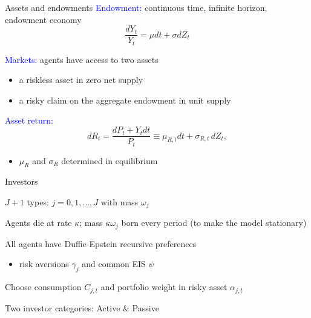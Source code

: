 \documentclass[12pt,aspectratio=169]{beamer}
\newenvironment{wideitemize}{\itemize\addtolength{\itemsep}{10pt}}{\enditemize}
\newcommand{\vspM}{\vspace{0.12truecm}}
\begin{document}
\begin{frame}{Assets and endowments}
    \textcolor{blue}{Endowment:} continuous time, infinite horizon, endowment economy 
    \[\frac{d Y_{t}}{Y_{t}}=\mu dt+\sigma dZ_{t}%
    \]
    
    \vspM
    \textcolor{blue}{Markets:} agents have access to two assets
    \begin{itemize}
        \item a riskless asset in zero net supply
        \item a risky claim on the aggregate endowment in unit supply
    \end{itemize}
    \vspM
    \textcolor{blue}{Asset return:}
    \[ d R_t = \frac{d P_t + Y_t dt}{P_t} \equiv \mu_{R,t} dt + \sigma_{R,t}\, d Z_t,\]
    \begin{itemize}
        \item $\mu_R$ and $\sigma_R$ determined in equilibrium
    \end{itemize}
\end{frame}

\begin{frame}{Investors}
\begin{wideitemize}
    \item $J+1$ types: $j=0,1,\ldots, J$ with mass $\omega_j$
    \item Agents die at rate $\kappa$; mass $\kappa\omega_j$ born every period {\scriptsize (to make the model stationary)}
    \item All agents have Duffie-Epstein recursive preferences\vspM
    \begin{itemize}\normalsize
        \item risk aversions $\gamma_j$ and common EIS $\psi$
    \end{itemize}
    \item Choose consumption $C_{j,t}$ and portfolio weight in risky asset $\alpha_{j,t}$
    \item Two investor categories: Active \& Passive
\end{wideitemize}
\end{frame}
\end{document}
